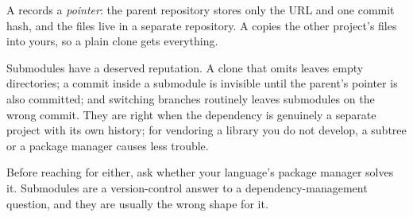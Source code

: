 \begin{intuition}
	A  records a \emph{pointer}: the parent repository stores only
	the URL and one commit hash, and the files live in a separate repository. A
	 copies the other project's files into yours, so a plain clone
	gets everything.
\end{intuition}

\begin{note}
	Submodules have a deserved reputation. A clone that omits
	 leaves empty directories; a commit inside a
	submodule is invisible until the parent's pointer is also committed; and
	switching branches routinely leaves submodules on the wrong commit. They are
	right when the dependency is genuinely a separate project with its own
	history; for vendoring a library you do not develop, a subtree or a package
	manager causes less trouble.
\end{note}

\begin{moral}
	Before reaching for either, ask whether your language's package manager solves
	it. Submodules are a version-control answer to a dependency-management
	question, and they are usually the wrong shape for it.
\end{moral}
